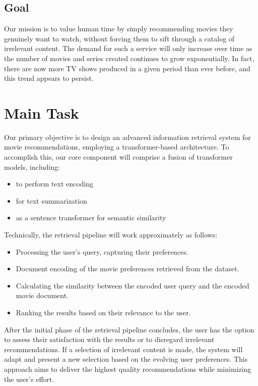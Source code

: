 \documentclass[11pt,a4paper]{article}
\begin{document}
  \subsection{Goal}
  Our mission is to value human time by simply recommending movies they genuinely want to watch, without forcing them to sift through a catalog of irrelevant content.
  The demand for such a service will only increase over time as the number of movies and series created continues to grow exponentially.
  In fact, there are now more TV shows produced in a given period than ever before, and this trend appears to persist.

  \section{Main Task}

  Our primary objective is to design an advanced information retrieval system for movie recommendations, employing a transformer-based architecture.
  To accomplish this, our core component will comprise a fusion of transformer models, including:
  \begin{itemize}
    \item to perform text encoding
    \item for text summarization
    \item as a sentence transformer for semantic similarity
  \end{itemize}

  \noindent Technically, the retrieval pipeline will work approximately as follows:
  \begin{itemize}
    \item Processing the user’s query, capturing their preferences.
    \item Document encoding of the movie preferences retrieved from the dataset.
    \item Calculating the similarity between the encoded user query and the encoded movie document.
    \item Ranking the results based on their relevance to the user.
  \end{itemize}

  \noindent After the initial phase of the retrieval pipeline concludes, the user has the option to assess their satisfaction with the results or to disregard irrelevant recommendations.
  If a selection of irrelevant content is made, the system will adapt and present a new selection based on the evolving user preferences.
  This approach aims to deliver the highest quality recommendations while minimizing the user’s effort.
\end{document}
